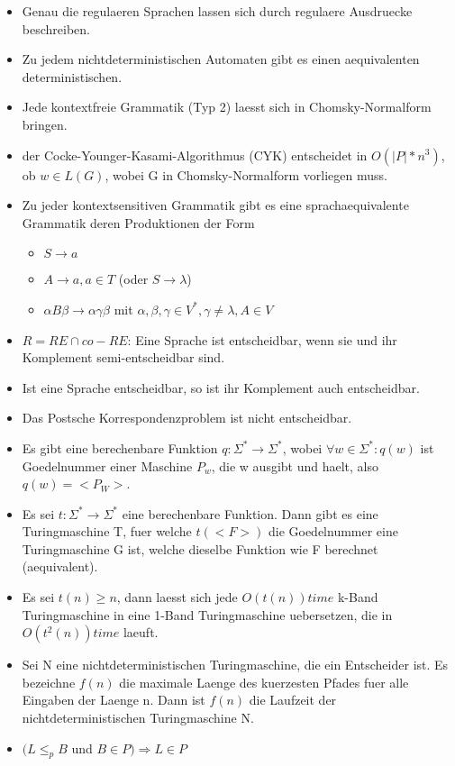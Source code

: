 \documentclass[a4paper]{scrreprt}
\begin{document}
\begin{itemize}
	\item Genau die regulaeren Sprachen lassen sich durch regulaere Ausdruecke beschreiben.
	\item Zu jedem nichtdeterministischen Automaten gibt es einen aequivalenten deterministischen.
	\item Jede kontextfreie Grammatik (Typ 2) laesst sich in Chomsky-Normalform bringen.
	\item der Cocke-Younger-Kasami-Algorithmus (CYK) entscheidet in $O(|P|*n^3)$, ob $w \in L(G)$, wobei G in Chomsky-Normalform vorliegen muss.
	\item Zu jeder kontextsensitiven Grammatik gibt es eine sprachaequivalente Grammatik deren Produktionen der Form
		\begin{itemize}
			\item $S \rightarrow a$
			\item $A \rightarrow a, a \in T$ (oder $S \rightarrow \lambda$)
			\item $\alpha B \beta \rightarrow \alpha\gamma\beta$ mit $\alpha,\beta,\gamma \in V^*,\gamma \neq \lambda, A \in V$
		\end{itemize}
	\item $R = RE \cap co-RE$: Eine Sprache ist entscheidbar, wenn sie und ihr Komplement semi-entscheidbar sind.
	\item Ist eine Sprache entscheidbar, so ist ihr Komplement auch entscheidbar.
	\item Das Postsche Korrespondenzproblem ist nicht entscheidbar.
	\item Es gibt eine berechenbare Funktion $q: \Sigma^* \rightarrow \Sigma^*$, wobei $\forall w \in \Sigma^*: q(w)$ ist Goedelnummer einer Maschine $P_w$, die w ausgibt und haelt, also $q(w) = <P_W>$.
	\item Es sei $t: \Sigma^* \rightarrow \Sigma^*$ eine berechenbare Funktion. Dann gibt es eine Turingmaschine T, fuer welche $t(<F>)$ die Goedelnummer eine Turingmaschine G ist, welche dieselbe Funktion wie F berechnet (aequivalent).
	\item Es sei $t(n) \ge n$, dann laesst sich jede $O(t(n)) time$ k-Band Turingmaschine in eine 1-Band Turingmaschine uebersetzen, die in $O(t^2(n)) time$ laeuft.
	\item Sei N eine nichtdeterministischen Turingmaschine, die ein Entscheider ist. Es bezeichne $f(n)$ die maximale Laenge des kuerzesten Pfades fuer alle Eingaben der Laenge n. Dann ist $f(n)$ die Laufzeit der nichtdeterministischen Turingmaschine N.
	\item $(L \le_p B$ und $B \in P) \Rightarrow L \in P$
\end{itemize}
\end{document}
